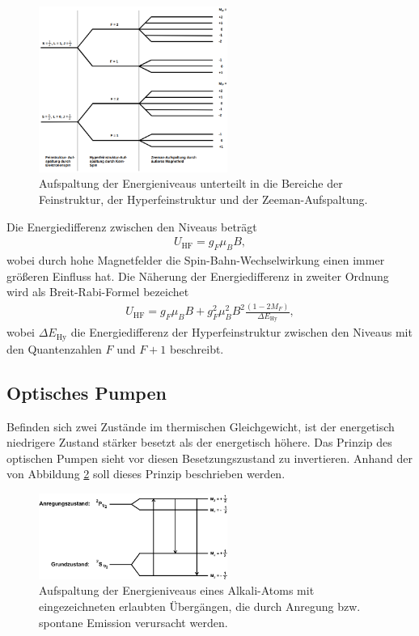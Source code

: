 \begin{figure}
	\centering
	\includegraphics[width=0.55\textwidth]{ressources/Aufspaltung.png}
	\caption{Aufspaltung der Energieniveaus unterteilt in die Bereiche der Feinstruktur, der Hyperfeinstruktur und der Zeeman-Aufspaltung. \cite{skript}}
	\label{fig:Aufspaltung}
\end{figure}

Die Energiedifferenz zwischen den Niveaus beträgt
\begin{align}
	U_\textrm{HF}=g_F\mu_BB,
	\label{eq:8}
\end{align}
wobei durch hohe Magnetfelder die Spin-Bahn-Wechselwirkung einen immer größeren Einfluss hat. Die Näherung der Energiedifferenz in zweiter Ordnung wird als Breit-Rabi-Formel bezeichet
\begin{align}
	U_\textrm{HF}=g_F\mu_BB+g_F^2\mu_B^2B^2\frac{(1-2M_F)}{\Delta E_\textrm{Hy}},
	\label{eq:16}
\end{align}
wobei $\Delta E_\textrm{Hy}$ die Energiedifferenz der Hyperfeinstruktur zwischen den Niveaus mit den Quantenzahlen $F$ und $F+1$ beschreibt.

\subsection{Optisches Pumpen}
\label{sec:optischesPumpen}
Befinden sich zwei Zustände im thermischen Gleichgewicht, ist der energetisch niedrigere Zustand stärker besetzt als der energetisch höhere. Das Prinzip des optischen Pumpen sieht vor diesen Besetzungszustand zu invertieren. Anhand der von Abbildung \ref{fig:optischesPumpen} soll dieses Prinzip beschrieben werden.

\begin{figure}
	\centering
	\includegraphics[width=0.55\textwidth]{ressources/optischesPumpen.png}
	\caption{Aufspaltung der Energieniveaus eines Alkali-Atoms mit eingezeichneten erlaubten Übergängen, die durch Anregung bzw. spontane Emission verursacht werden. \cite{skript}}
	\label{fig:optischesPumpen}
\end{figure}

